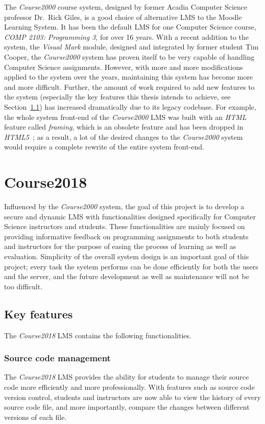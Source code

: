 The \emph{Course2000} course system, designed by former Acadia Computer Science
professor Dr.~Rick Giles, is a good choice
of alternative LMS to the Moodle Learning System.
It has been the
default LMS for one Computer Science course, \emph{COMP 2103: Programming 3},
for over 16 years.
With a recent addition to the system,
the \emph{Visual Mark} module,
designed and integrated by former student Tim Cooper,
the \emph{Course2000} system has proven itself
to be very capable of handling Computer Science assignments.
However, with more
and more modifications applied to the system over the years, maintaining
this system has become more and more difficult.
Further, the amount of work required to add new features to the
system (especially the key features this thesis intends to achieve,
see Section~\ref{FEATURES}) has increased dramatically
due to its legacy codebase.
For example, the whole system front-end of the \emph{Course2000} LMS was built
with an \emph{HTML} feature called \emph{framing}, which is an obsolete feature
and has been dropped in \emph{HTML5}~\cite{framing};
as a result, a lot of the desired changes to the \emph{Course2000} system would
require a complete rewrite of the entire system front-end.

\section{Course2018}
Influenced by the \emph{Course2000} system, the goal of this project is to
develop a secure and dynamic LMS with functionalities designed specifically for
Computer Science instructors and students.
These functionalities are mainly focused on
providing informative feedback on programming assignments to both students
and instructors for the purpose of easing the process of learning as well as
evaluation.
Simplicity of the overall system design is an important goal of this project;
every task the system 
performs can be done efficiently for both the users and the server,
and the future development as well as maintenance will not be too difficult.

\subsection{Key features}
\label{FEATURES}
The \emph{Course2018} LMS contains the following functionalities.

\subsubsection{Source code management}
The \emph{Course2018} LMS provides the ability for students to manage
their source code more efficiently and more professionally. With features such
as source code version control, students and instructors are now able
to view the history of every source code file, and more importantly, compare
the changes between different versions of each file.

